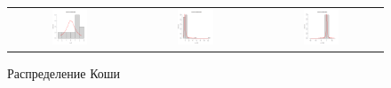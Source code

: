 \documentclass[a4paper,14pt]{article}
\begin{document}
	\begin{figure}[H]
		\centering
		\begin{tabular}{c c c}
			\includegraphics[height = 0.25\textheight, width = 0.31\textwidth]{./lab1_1/pictures/ n = 10 cauchy distribution.png}
			& \includegraphics[height = 0.25\textheight, width = 0.31\textwidth]{./lab1_1/pictures/ n = 100 cauchy distribution.png}
			& \includegraphics[height = 0.25\textheight, width = 0.31\textwidth]{./lab1_1/pictures/ n = 1000 cauchy distribution.png}
		\end{tabular}
		\caption{Распределение Коши}
	\end{figure}
	
\end{document}
